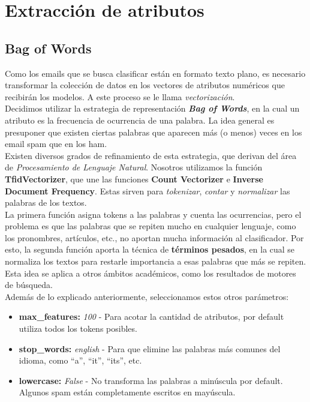 \section{Extracción de atributos}
\subsection{Bag of Words}
Como los emails que se busca clasificar están en formato texto plano, es necesario transformar la colección de datos en los vectores de atributos numéricos que recibirán los modelos. A este proceso se le llama \textit{vectorización}.\\

Decidimos utilizar la estrategia de representación \textbf{\textit{Bag of Words}}, en la cual un atributo es la frecuencia de ocurrencia de una palabra. La idea general es presuponer que existen ciertas palabras que aparecen más (o menos) veces en los email spam que en los ham. \\

Existen diversos grados de refinamiento de esta estrategia, que derivan del área de \textit{Procesamiento de Lenguaje Natural}. Nosotros utilizamos la función \textbf{TfidVectorizer}, que une las funciones \textbf{Count Vectorizer} e \textbf{Inverse Document Frequency}. Estas sirven para \textit{tokenizar}, \textit{contar} y \textit{normalizar} las palabras de los textos.\\

La primera función asigna tokens a las palabras y cuenta las ocurrencias, pero el problema es que las palabras que se repiten mucho en cualquier lenguaje, como los pronombres, artículos, etc., no aportan mucha información al clasificador. Por esto, la segunda función aporta la técnica de \textbf{términos pesados}, en la cual se normaliza los textos para restarle importancia a esas palabras que más se repiten. Esta idea se aplica a otros ámbitos académicos, como los resultados de motores de búsqueda.\\

Además de lo explicado anteriormente, seleccionamos estos otros parámetros:
\begin{itemize}
\item \textbf{max\_features:} \textit{100} - Para acotar la cantidad de atributos, por default utiliza todos los tokens posibles.
\item \textbf{stop\_words:} \textit{english} - Para que elimine las palabras más comunes del idioma, como ``a'', ``it'', ``its'', etc.
\item \textbf{lowercase:} \textit{False} - No transforma las palabras a minúscula por default. Algunos spam están completamente escritos en mayúscula.
\end{itemize}


